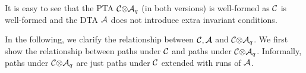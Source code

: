 \begin{remark}
It is easy to see that the PTA ${\mathcal{C}}{\otimes}{\mathcal{A}_q}$ (in both versions) is well-formed as $\mathcal{C}$ is well-formed and the DTA $\mathcal{A}$ does not introduce extra invariant conditions.
\end{remark}

In the following, we clarify the relationship between $\mathcal{C},\mathcal{A}$ and ${\mathcal{C}}{\otimes}{\mathcal{A}_q}$.
We first show the relationship between paths under $\mathcal{C}$ and paths under ${\mathcal{C}}{\otimes}{\mathcal{A}_q}$.
Informally, paths under ${\mathcal{C}}{\otimes}{\mathcal{A}_q}$ are just paths under $\mathcal{C}$ extended with runs of $\mathcal{A}$.

